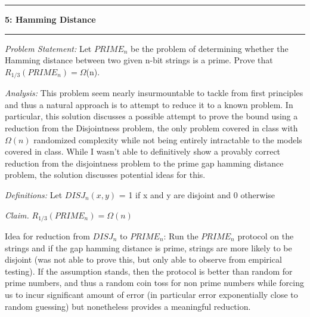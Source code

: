 \documentclass[11pt]{article}
\newcommand\question[2]{\vspace{.25in}\hrule\textbf{#1: #2}\vspace{.5em}\hrule\vspace{.10in}}
\newcommand\analysis{\vspace{.10in}\emph{Analysis: }\newline}
\newcommand\problem{\emph{Problem Statement:}\newline}
\newcommand\definitions{\emph{Definitions:}\newline}
\newcommand\claim{\emph{Claim.}\newline}
\begin{document}
\raggedright
\newcommand\NAME{Siddharth Joshi}  %
\newcommand\HWNUM{}              %


\question{5}{Hamming Distance} 

\problem
Let $PRIME_n$ be the problem of determining whether the Hamming distance between two given n-bit strings is a prime. \newline
Prove that $R_{1/3}(PRIME_n) = \Omega$(n).

\analysis
This problem seem nearly insurmountable to tackle from first principles and thus a natural approach is to attempt to reduce it to a known problem. In particular, this solution discusses a possible attempt to prove the bound using a reduction from the Disjointness problem, the only problem covered in class with $\Omega(n)$ randomized complexity while not being entirely intractable to the models covered in class. While I wasn't able to definitively show a provably correct reduction from the disjointness problem to the prime gap hamming distance problem, the solution discusses potential ideas for this. \newline

\definitions
Let $DISJ_n(x, y)$ = 1 if x and y are disjoint and 0 otherwise \newline

\claim
$R_{1/3}(PRIME_n) = \Omega(n)$ \newline

\proof 
Idea for reduction from $DISJ_n$ to $PRIME_n$: \newline
Run the $PRIME_n$ protocol on the strings and if the gap hamming distance is prime, strings are more likely to be disjoint (was not able to prove this, but only able to observe from empirical testing). \newline
If the assumption stands, then the protocol is better than random for prime numbers, and thus a random coin toss for non prime numbers while forcing us to incur significant amount of error (in particular error exponentially close to random guessing) but nonetheless provides a meaningful reduction. \newline
\end{document}
